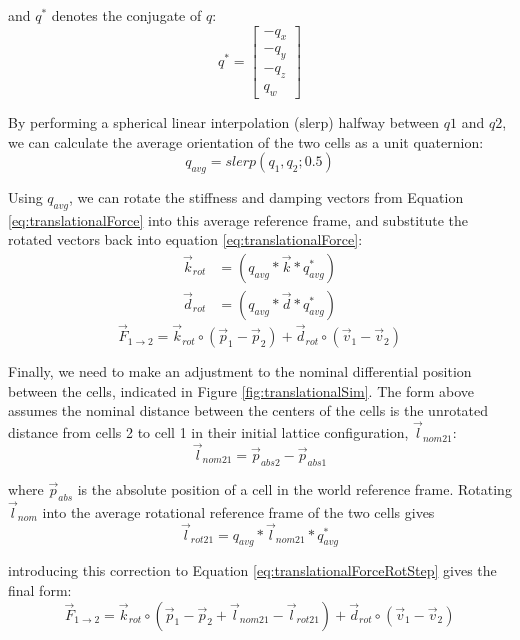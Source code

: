 {   and $q^*$ denotes the conjugate of $q$:
    \[ q^{*} =  \left[ \begin{array}{ccc}
-q_x\\
-q_y\\
-q_z\\
q_w
 \end{array} \right] \] 
 
By performing a spherical linear interpolation (slerp) halfway between $q1$ and $q2$, we can calculate the average orientation of the two cells as a unit quaternion:
  \[ q_{avg} = slerp(q_{1}, q_{2}; 0.5) \]
  
Using $q_{avg}$, we can rotate the stiffness and damping vectors from Equation \ref{eq:translationalForce} into this average reference frame, and substitute the rotated vectors back into equation \ref{eq:translationalForce}:
\begin{subequations}
\begin{align}
\label{eq:krotated}
 \vec{k}_{rot} &= (q_{avg}*\vec{k}*q_{avg}^*)\\
 \label{eq:drotated}
  \vec{d}_{rot} &= (q_{avg}*\vec{d}*q_{avg}^*)
  \end{align}
  \end{subequations}
  \begin{equation} \label{eq:translationalForceRotStep}
 \vec{F}_{1\rightarrow2} = \vec{k}_{rot} \circ (\vec{p}_1 - \vec{p}_2) + \vec{d}_{rot} \circ (\vec{v}_1 - \vec{v}_2)
 \end{equation}
 
Finally, we need to make an adjustment to the nominal differential position between the cells, indicated in Figure \ref{fig:translationalSim}.  The form above assumes the nominal distance between the centers of the cells is the unrotated distance from cells 2 to cell 1 in their initial lattice configuration, $\vec{l}_{nom21}$:
\begin{equation}\label{eq:lnominal}
\vec{l}_{nom21} = \vec{p}_{abs2}-\vec{p}_{abs1}
\end{equation}
 
 where $\vec{p}_{abs}$ is the absolute position of a cell in the world reference frame.
 Rotating $\vec{l}_{nom}$ into the average rotational reference frame of the two cells gives
 \[\vec{l}_{rot21} = q_{avg}*\vec{l}_{nom21}*q_{avg}^*\]
 
introducing this correction to Equation \ref{eq:translationalForceRotStep} gives the final form:
 \begin{equation} \label{eq:translationalForceRot}
  \vec{F}_{1\rightarrow2} = \vec{k}_{rot} \circ (\vec{p}_1 - \vec{p}_2 + \vec{l}_{nom21}-\vec{l}_{rot21}) + \vec{d}_{rot} \circ (\vec{v}_1 - \vec{v}_2)
  \end{equation}

}
